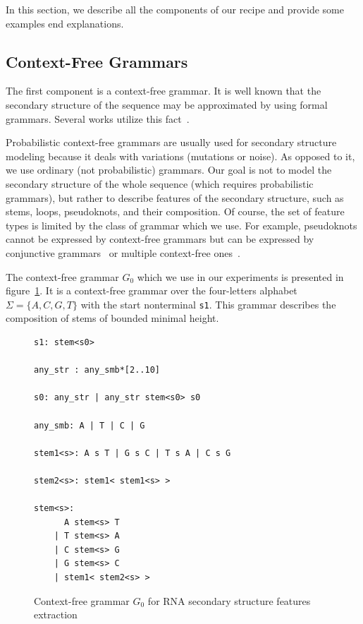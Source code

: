 \documentclass[a4paper,twoside]{article}
\begin{document}
In this section, we describe all the components of our recipe and provide some examples end explanations.
 
\subsection{Context-Free Grammars}

\noindent The first component is a context-free grammar. 
It is well known that the secondary structure of the sequence may be approximated by using formal grammars.
Several works utilize this fact~\cite{GrammarsRNA,LWPCFG,zier2013rna,knudsen2003pfold}.

Probabilistic context-free grammars are usually used for secondary structure modeling because it deals with variations (mutations or noise).
As opposed to it, we use ordinary (not probabilistic) grammars.
Our goal is not to model the secondary structure of the whole sequence (which requires probabilistic grammars), but rather to describe features of the secondary structure, such as stems, loops, pseudoknots, and their composition.
Of course, the set of feature types is limited by the class of grammar which we use.
For example, pseudoknots cannot be expressed by context-free grammars but can be expressed by conjunctive grammars~\cite{KanchanDevi2017,zier2013rna,Okhotin:2001:CG:543313.543323} or multiple context-free ones~\cite{SEKI1991191,Riechert:2016:ADP:2972703.2972851}.

The context-free grammar $G_0$ which we use in our experiments is presented in figure~\ref{fig:cfg-rna}.
It is a context-free grammar over the four-letters alphabet $\Sigma=\{A,C,G,T\}$ with the start nonterminal \verb|s1|.
This grammar describes the composition of stems of bounded minimal height.

\begin{figure}
\begin{verbatim}
s1: stem<s0>

any_str : any_smb*[2..10]

s0: any_str | any_str stem<s0> s0

any_smb: A | T | C | G

stem1<s>: A s T | G s C | T s A | C s G 

stem2<s>: stem1< stem1<s> >

stem<s>:  
      A stem<s> T 
    | T stem<s> A 
    | C stem<s> G 
    | G stem<s> C 
    | stem1< stem2<s> >  
\end{verbatim}
\caption{Context-free grammar $G_0$ for RNA secondary structure features extraction}
\label{fig:cfg-rna}
\end{figure}
\end{document}
